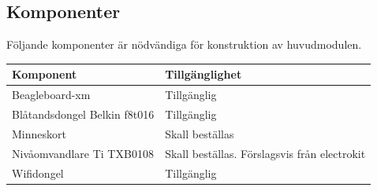 \subsection{Komponenter}
Följande komponenter är nödvändiga för konstruktion av huvudmodulen.\\
\begin{tabularx}{\textwidth}{| l | X |}
	\hline
	{\textbf{Komponent}} & {\textbf{Tillgänglighet}} \\\hline
	{Beagleboard-xm} & {Tillgänglig} \\\hline
	{Blåtandsdongel Belkin f8t016} & {Tillgänglig} \\\hline
	{Minneskort} & {Skall beställas} \\\hline
	{Nivåomvandlare Ti TXB0108} & {Skall beställas. Förslagsvis från electrokit\cite{nivaomvandlare}} \\\hline
	{Wifidongel} & {Tillgänglig} \\\hline
\end{tabularx}
